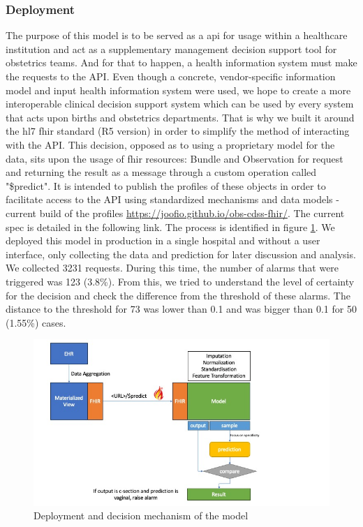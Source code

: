 \subsubsection{Deployment}
The purpose of this model is to be served as a \ac{api} for usage within a healthcare institution and act as a supplementary management decision support tool for obstetrics teams. And for that to happen, a health information system must make the requests to the API. Even though a concrete, vendor-specific information model and input health information system were used, we hope to create a more interoperable clinical decision support system which can be used by every system that acts upon births and obstetrics departments. That is why we built it around the \ac{hl7} \ac{fhir} standard (R5 version) in order to simplify the method of interacting with the API. This decision, opposed as to using a proprietary model for the data, sits upon the usage of \ac{fhir} resources: Bundle and Observation for request and returning the result as a message through a custom operation called "\$predict". It is intended to publish the profiles of these objects in order to facilitate access to the API using standardized mechanisms and data models - current build of the profiles \url{https://joofio.github.io/obs-cdss-fhir/}. The current spec is detailed in the following link. The process is identified in figure \ref{fig:deploy}.
We deployed this model in production in a single hospital and without a user interface, only collecting the data and prediction for later discussion and analysis. We collected 3231 requests. During this time, the number of alarms that were triggered was 123 (3.8\%). From this, we tried to understand the level of certainty for the decision and check the difference from the threshold of these alarms. The distance to the threshold for 73 was lower than 0.1 and was bigger than 0.1 for 50 (1.55\%) cases.


\begin{figure}[htbp]
\centering
\captionsetup{justification=centering}
\caption{Deployment and decision mechanism of the model}\label{fig:deploy} 
\includegraphics[scale=0.60]{figures/obs-model.jpg}
\end{figure}

